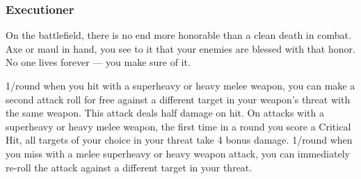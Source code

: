 \subsubsection{Executioner}

\begin{talent}
{On the battlefield, there is no end more honorable than a clean death in combat. Axe or maul in hand, you see to it that your enemies are blessed with that honor. No one lives forever — you make sure of it.}

1/round when you hit with a superheavy or heavy melee weapon, you can make a second attack roll for free against a different target in your weapon’s threat with the same weapon. This attack deals half damage on hit. 
On attacks with a superheavy or heavy melee weapon, the first time in a round you score a Critical Hit, all targets of your choice in your threat take 4 bonus damage. 
1/round when you miss with a melee superheavy or heavy weapon attack, you can immediately re-roll the attack against a different target in your threat.
\end{talent}